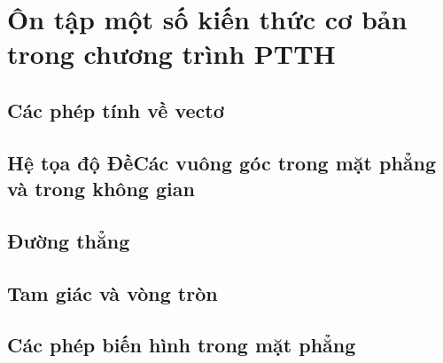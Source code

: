 \chapter{Ôn tập một số kiến thức cơ bản trong chương trình PTTH}
\section{Các phép tính về vectơ}
\section{Hệ tọa độ ĐềCác vuông góc  trong mặt phẳng và trong không gian}
\section{Đường thẳng}
\section{Tam giác và vòng tròn}
\section{Các phép biến  hình trong mặt phẳng}
